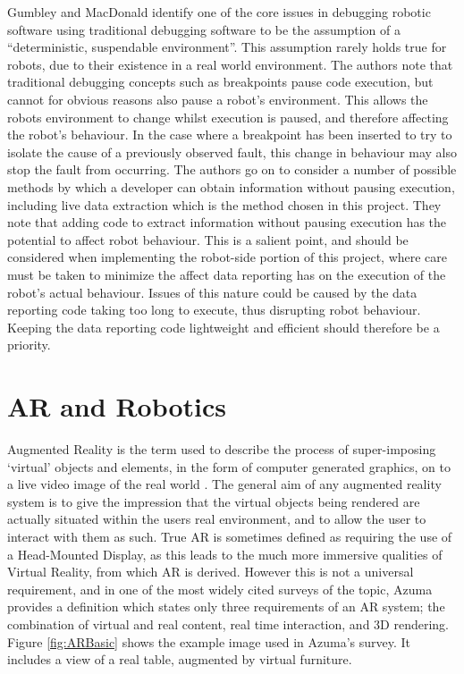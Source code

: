 Gumbley and MacDonald \cite{Gumbley:2009} identify one of the core issues in debugging robotic software using traditional debugging software to be the assumption of a ``deterministic, suspendable environment''. This assumption rarely holds true for robots, due to their existence in a real world environment. The authors note that traditional debugging concepts such as breakpoints pause code execution, but cannot for obvious reasons also pause a robot's environment. This allows the robots environment to change whilst execution is paused, and therefore affecting the robot's behaviour. In the case where a breakpoint has been inserted to try to isolate the cause of a previously observed fault, this change in behaviour may also stop the fault from occurring. The authors \cite{Gumbley:2009} go on to consider a number of possible methods by which a developer can obtain information without pausing execution, including live data extraction which is the method chosen in this project. They note that adding code to extract information without pausing execution has the potential to affect robot behaviour. This is a salient point, and should be considered when implementing the robot-side portion of this project, where care must be taken to minimize the affect data reporting has on the execution of the robot's actual behaviour. Issues of this nature could be caused by the data reporting code taking too long to execute, thus disrupting robot behaviour. Keeping the data reporting code lightweight and efficient should therefore be a priority.


\section{AR and Robotics} \label{AugmentedReality}
Augmented Reality is the term used to describe the process of super-imposing `virtual' objects and elements, in the form of computer generated graphics, on to a live video image of the real world \cite{Azuma:1997}. The general aim of any augmented reality system is to give the impression that the virtual objects being rendered are actually situated within the users real environment, and to allow the user to interact with them as such. True AR is sometimes defined as requiring the use of a Head-Mounted Display, as this leads to the much more immersive qualities of Virtual Reality, from which AR is derived. However this is not a universal requirement, and in one of the most widely cited surveys of the topic, Azuma \cite{Azuma:1997} provides a definition which states only three requirements of an AR system; the combination of virtual and real content, real time interaction, and 3D rendering. Figure \ref{fig:ARBasic} shows the example image used in Azuma's \cite{Azuma:1997} survey. It includes a view of a real table, augmented by virtual furniture.

